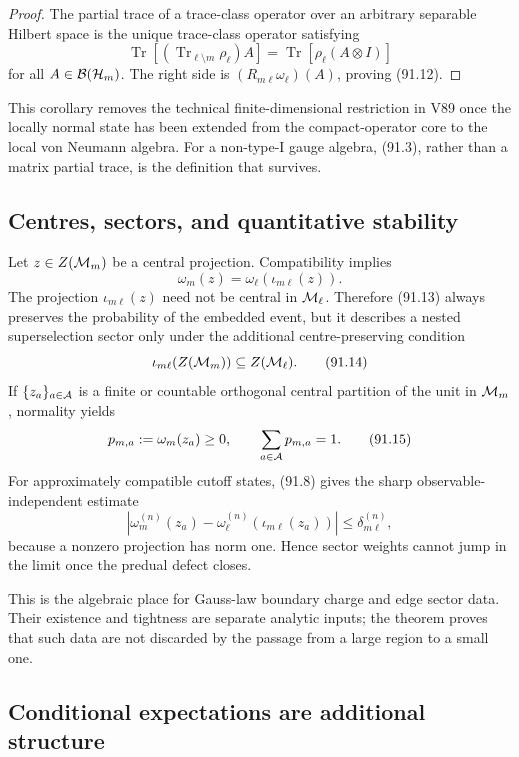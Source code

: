 \documentclass[11pt]{article}
\theoremstyle{remark}
\begin{document}
\begin{proof}
The partial trace of a trace-class operator over an arbitrary
separable Hilbert space is the unique trace-class operator satisfying
\[
 \operatorname{Tr}\!\left[
  (\operatorname{Tr}_{\ell\setminus m}\rho_\ell)A\right]
 =\operatorname{Tr}[\rho_\ell(A\otimes I)]
\]
for all \(A\in{\cal B}({\cal H}_m)\).  The right side is
\((R_{m\ell}\omega_\ell)(A)\), proving (91.12).
\end{proof}

This corollary removes the technical finite-dimensional restriction
in V89 once the locally normal state has been extended from the
compact-operator core to the local von Neumann algebra.  For a
non-type-I gauge algebra, (91.3), rather than a matrix partial trace,
is the definition that survives.

\subsection{Centres, sectors, and quantitative stability}

Let \(z\in Z({\cal M}_m)\) be a central projection.  Compatibility
implies
\[
 \omega_m(z)=\omega_\ell(\iota_{m\ell}(z)).                       \tag{91.13}
\]
The projection \(\iota_{m\ell}(z)\) need not be central in
\({\cal M}_\ell\).  Therefore (91.13) always preserves the
probability of the embedded event, but it describes a nested
superselection sector only under the additional centre-preserving
condition
\[
 \iota_{m\ell}(Z({\cal M}_m))\subseteq Z({\cal M}_\ell).           \tag{91.14}
\]
If \(\{z_a\}_{a\in{\cal A}}\) is a finite or countable orthogonal
central partition of the unit in \({\cal M}_m\), normality yields
\[
 p_{m,a}:=\omega_m(z_a)\geq0,\qquad
 \sum_{a\in{\cal A}}p_{m,a}=1.                                   \tag{91.15}
\]
For approximately compatible cutoff states, (91.8) gives the sharp
observable-independent estimate
\[
 \left|\omega_m^{(n)}(z_a)
 -\omega_\ell^{(n)}(\iota_{m\ell}(z_a))\right|
 \leq\delta_{m\ell}^{(n)},                                       \tag{91.16}
\]
because a nonzero projection has norm one.  Hence sector weights
cannot jump in the limit once the predual defect closes.

This is the algebraic place for Gauss-law boundary charge and edge
sector data.  Their existence and tightness are separate analytic
inputs; the theorem proves that such data are not discarded by the
passage from a large region to a small one.

\subsection{Conditional expectations are additional structure}
\end{document}
